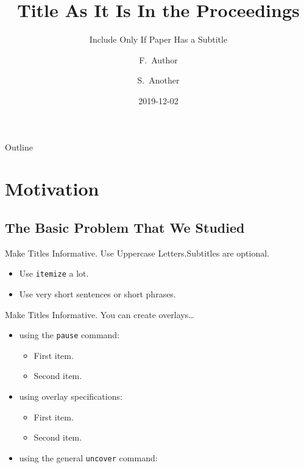 \documentclass{beamer}
\title[Short Paper Title]
{Title As It Is In the Proceedings}
\subtitle
{Include Only If Paper Has a Subtitle}
\author[Author, Another] %
{F.~Author\inst{1} \and S.~Another\inst{2}}
\institute[Universities of Somewhere and Elsewhere] %
{
  \inst{1}%
  University of Somewhere
  \qquad
  \inst{2}%
  University of Elsewhere}
\date[CFP 2003] %
{2019-12-02}
\begin{document}
\begin{frame}[plain, t]
  \titlepage
\end{frame}

\begin{frame}{Outline}
  \tableofcontents
\end{frame}

\section{Motivation}

\subsection{The Basic Problem That We Studied}

\begin{frame}{Make Titles Informative. Use Uppercase Letters.}{Subtitles are optional.}
  \begin{itemize}
  \item
    Use \texttt{itemize} a lot.
  \item
    Use very short sentences or short phrases.
  \end{itemize}
\end{frame}

\begin{frame}{Make Titles Informative.}
  You can create overlays\dots
  \begin{itemize}
  \item using the \texttt{pause} command:
    \begin{itemize}
    \item
      First item.
      \pause
    \item
      Second item.
    \end{itemize}
  \item
    using overlay specifications:
    \begin{itemize}
    \item<3->
      First item.
    \item<4->
      Second item.
    \end{itemize}
  \item
    using the general \texttt{uncover} command:
    \begin{itemize}
    \end{itemize}
  \end{itemize}
\end{frame}
\end{document}
